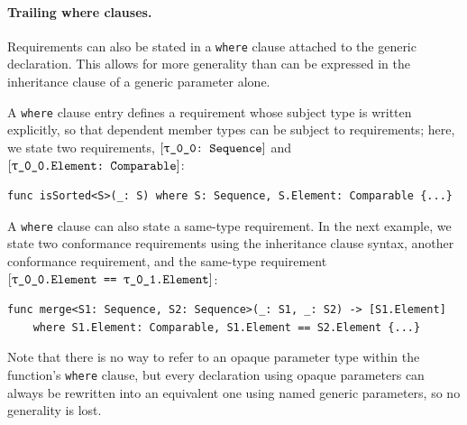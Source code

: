 \documentclass[../generics]{subfiles}
\begin{document}
\paragraph{Trailing where clauses.} Requirements can also be stated in a \texttt{where} clause attached to the generic declaration. This allows for more generality than can be expressed in the inheritance clause of a generic parameter alone.

A \texttt{where} clause entry defines a requirement whose subject type is written explicitly, so that dependent member types can be subject to requirements; here, we state two requirements, $\rTSequence$ and $\ConfReq{\rT.Element}{Comparable}$:
\begin{Verbatim}
func isSorted<S>(_: S) where S: Sequence, S.Element: Comparable {...}
\end{Verbatim}

A \texttt{where} clause can also state a same-type requirement. In the next example, we state two conformance requirements using the inheritance clause syntax, another conformance requirement, and the same-type requirement $\SameReq{\rT.Element}{\rU.Element}$:
\begin{Verbatim}
func merge<S1: Sequence, S2: Sequence>(_: S1, _: S2) -> [S1.Element]
    where S1.Element: Comparable, S1.Element == S2.Element {...}
\end{Verbatim}

Note that there is no way to refer to an opaque parameter type within the function's \texttt{where} clause, but every declaration using opaque parameters can always be rewritten into an equivalent one using named generic parameters, so no generality is lost.
\end{document}
